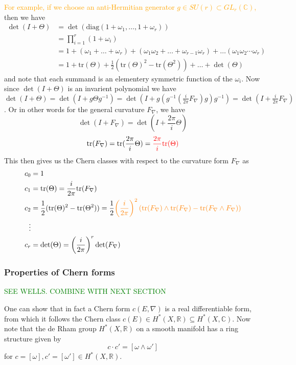\documentclass[a4paper]{article}
\theoremstyle{definition} \newtheorem*{definition}{Definition}
\theoremstyle{definition} \newtheorem*{definitions}{Definitions}
\theoremstyle{plain} \newtheorem{theorem}{Theorem}[section]
\theoremstyle{plain} \newtheorem{proposition}[theorem]{Proposition}
\theoremstyle{plain} \newtheorem{corollary}[theorem]{Corollary}
\theoremstyle{plain} \newtheorem{lemma}[theorem]{Lemma}
\theoremstyle{plain} \newtheorem{example}[theorem]{Example}
\newcommand{\checkCorrect}[1]{\textcolor{red}{#1}}
\newcommand{\understandBetter}[1]{\textcolor{orange}{#1}}
\newcommand{\finish}[1]{\textcolor{green}{#1}}
\newcommand{\realnos}{\mathbb{R}}
\newcommand{\complexnos}{\mathbb{C}}
\newcommand{\tr}{\text{tr}}
\begin{document}
\understandBetter{For example, if we choose an anti-Hermitian generator $g\in SU(r)\subset GL_r(\complexnos)$,} then we have
\begin{align*}
    \det(I+\Theta) &= \det (\text{diag}(1+\omega_1, \ldots, 1+\omega_r)) \\
    & = \prod_{i=1}^r (1+\omega_i) \\
    & = 1 + (\omega_1 + \ldots + \omega_r) + (\omega_1\omega_2 +\ldots + \omega_{r-1}\omega_r) + \ldots (\omega_1\omega_2\cdots \omega_r) \\
    & = 1 + \tr(\Theta) + \frac{1}{2}(\tr(\Theta)^2 - \tr(\Theta^2)) + \ldots + \det (\Theta) 
\end{align*}
and note that each summand is an elementery symmetric function of the $\omega_i$.
Now since $\det(I+\Theta)$ is an invarient polynomial we have $\det(I+\Theta)=\det(I+g\Theta g^{-1})=\det(I+g (g^{-1} (\frac{i}{2\pi} F_\nabla) g) g^{-1}) = \det (I+ \frac{i}{2\pi} F_\nabla)$. 
Or in other words for the general curvature $F_\nabla$, we have 
$$\det(I+F_\nabla)=\det(I+\frac{2\pi}{i}\Theta)$$
$$\tr(F_\nabla)= \tr( \frac{2\pi}{i} \Theta)= \checkCorrect{\frac{2\pi}{i} \tr(\Theta)}$$
This then gives us the Chern classes with respect to the curvature form $F_\nabla$ as
\begin{align*}
    c_0 & = 1 \\
    c_1 & = \tr(\Theta) = \frac{i}{2\pi} \tr(F_\nabla)
    \\
     c_2 & = \frac{1}{2}(\tr(\Theta)^2 - \tr(\Theta^2))  = \frac{1}{2} \understandBetter{\left( \frac{i}{2\pi} \right)^2 (\tr(F_\nabla)\wedge\tr(F_\nabla) - \tr(F_\nabla\wedge F_\nabla))} \\
    \vdots & \\
     c_r & = \det(\Theta)=\left( \frac{i}{2\pi} \right)^r \det(F_\nabla) 
\end{align*}


\subsubsection{Properties of Chern forms}

\finish{SEE WELLS. COMBINE WITH NEXT SECTION}

One can show that in fact a Chern form $c(E, \nabla)$ is a real differentiable form, from which it follows the Chern class $c(E)\in H^*(X, \realnos)\subseteq H^*(X, \complexnos)$.  Now note that the de Rham group $H^*(X, \realnos)$ on a smooth manifold has a ring structure given by 
$$c\cdot c' = [\omega \wedge \omega'] $$
for $c=[\omega], c'=[\omega '] \in H^*(X, \realnos)$.
\end{document}
